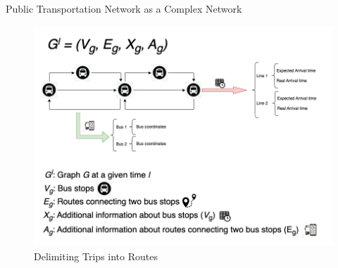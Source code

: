 \documentclass[xcolor=dvipsnames,table]{beamer}
\begin{document}
\begin{frame}{Public Transportation Network as a Complex Network}
        \begin{figure}[H]
                \centering
                \includegraphics[scale=0.3]{images/final_graph.png}
                \caption{Delimiting Trips into Routes}
        \end{figure}
\end{frame}
\end{document}

